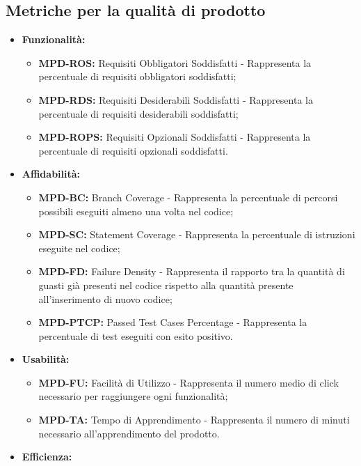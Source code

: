\documentclass[8pt]{article}
\begin{document}
\subsection{Metriche per la qualità di prodotto}
\begin{itemize}
    \item \textbf{Funzionalità:}
        \begin{itemize}
            \item \textbf{MPD-ROS:} Requisiti Obbligatori Soddisfatti - Rappresenta la percentuale di requisiti obbligatori soddisfatti;
            \item \textbf{MPD-RDS:} Requisiti Desiderabili Soddisfatti - Rappresenta la percentuale di requisiti desiderabili soddisfatti;
            \item \textbf{MPD-ROPS:} Requisiti Opzionali Soddisfatti - Rappresenta la percentuale di requisiti opzionali soddisfatti.
        \end{itemize}
    \item \textbf{Affidabilità:}
        \begin{itemize}
            \item \textbf{MPD-BC:} Branch Coverage - Rappresenta la percentuale di percorsi possibili eseguiti almeno una volta nel codice;
            \item \textbf{MPD-SC:} Statement Coverage - Rappresenta la percentuale di istruzioni eseguite nel codice;
            \item \textbf{MPD-FD:} Failure Density - Rappresenta il rapporto tra la quantità di guasti già presenti nel codice rispetto alla quantità presente all'inserimento di nuovo codice;
            \item \textbf{MPD-PTCP:} Passed Test Cases Percentage - Rappresenta la percentuale di test eseguiti con esito positivo.
        \end{itemize}
    \item \textbf{Usabilità:}
        \begin{itemize}
            \item \textbf{MPD-FU:} Facilità di Utilizzo - Rappresenta il numero medio di click necessario per raggiungere ogni funzionalità;
            \item \textbf{MPD-TA:} Tempo di Apprendimento - Rappresenta il numero di minuti necessario all'apprendimento del prodotto.
        \end{itemize}
    \item \textbf{Efficienza:}
        \begin{itemize}

\end{itemize}
\end{itemize}
\end{document}
